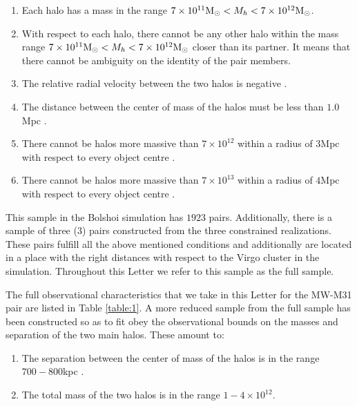 \documentclass{emulateapj}
\newcommand{\Msun}{{\ifmmode{{\rm {M_{\odot}}}}\else{${\rm{M_{\odot}}}$}\fi}}
\begin{document}
\begin{enumerate}
\item Each halo has a mass in the range $7\times10^{11}\Msun
  <M_{h}<7\times 10^{12}\Msun$. 
\item With respect to each halo, there cannot be any other halo within
  the mass range $7\times10^{11}\Msun <M_{h}<7\times 10^{12}\Msun$
  closer than its partner. It means that there cannot be ambiguity on
  the identity of the pair members. 
\item The relative radial velocity between the two halos is negative
  \citep{vanderMarel12}. 
\item The distance between the center of mass of the halos must be
  less than $1.0$Mpc \citep{ribas05,vanderMarel08}. 
\item There cannot be halos more massive than $7\times 10^{12}$\Msun
  within a radius of $3$Mpc with respect to every object centre
  \citep{Karachentsev04,Anton09}. 
\item There cannot be halos more massive than $7\times 10^{13}$\Msun
  within  a radius of $4$Mpc with respect to every object centre
  \citep{Karachentsev04}. 
\end{enumerate}


This sample in the Bolshoi simulation has $1923$ pairs. Additionally,
there is a sample of three (3) pairs constructed from the three
constrained realizations. These pairs fulfill all the above mentioned
conditions and additionally are located in a place with the right
distances with respect to the Virgo cluster in the simulation. 
Throughout this Letter we refer to this sample as the full
sample. 


The full observational characteristics that we take in this Letter for
the MW-M31 pair are listed in Table \ref{table:1}.  
A more reduced sample from the full sample has been constructed
so as to fit obey the observational bounds on the masses and
separation of the two main halos. These amount to:   
\begin{enumerate}
\item The separation between the center of mass of the halos is in the
  range $700-800$kpc \citep{ribas05,vanderMarel08}. 
\item The total mass of the two halos is in the range $1-4\times
  10^{12}$\Msun \citep{vanderMarel12}. 
\end{enumerate}
\end{document}

